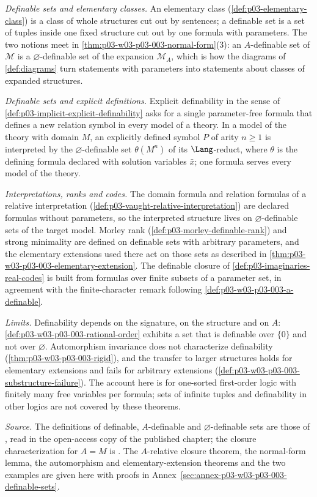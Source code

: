 \emph{Definable sets and elementary classes.}  An elementary class
(\cref{def:p03-elementary-class}) is a class of whole structures cut out by
sentences; a definable set is a set of tuples inside one fixed structure cut
out by one formula with parameters.  The two notions meet in
\cref{thm:p03-w03-p03-003-normal-form}(3): an \(A\)-definable set of
\(\mathcal M\) is a \(\varnothing\)-definable set of the expansion
\(\mathcal M_A\), which is how the diagrams of \cref{def:diagrams} turn
statements with parameters into statements about classes of expanded
structures.

\emph{Definable sets and explicit definitions.}  Explicit definability in
the sense of \cref{def:p03-implicit-explicit-definability} asks for a single
parameter-free formula that defines a new relation symbol in every model of
a theory.  In a model of the theory with domain \(M\), an explicitly
defined symbol \(P\) of arity \(n\geq1\) is
interpreted by the \(\varnothing\)-definable set \(\theta(M^n)\) of its
\(\Lang\)-reduct, where \(\theta\) is the defining formula declared with
solution variables \(\bar x\); one formula serves every model of the theory.

\emph{Interpretations, ranks and codes.}  The domain formula and relation
formulas of a relative interpretation
(\cref{def:p03-vaught-relative-interpretation}) are declared formulas
without parameters, so the interpreted structure lives on
\(\varnothing\)-definable sets of the target model.  Morley rank
(\cref{def:p03-morley-definable-rank}) and strong minimality are defined on
definable sets with arbitrary parameters, and the elementary extensions used
there act on those sets as described in
\cref{thm:p03-w03-p03-003-elementary-extension}.  The definable closure of
\cref{def:p03-imaginaries-real-codes} is built from formulas over finite
subsets of a parameter set, in agreement with the finite-character remark
following \cref{def:p03-w03-p03-003-a-definable}.

\emph{Limits.}  Definability depends on the signature, on the structure and
on \(A\): \cref{def:p03-w03-p03-003-rational-order} exhibits a set that is
definable over \(\{0\}\) and not over \(\varnothing\).  Automorphism
invariance does not characterize definability
(\cref{thm:p03-w03-p03-003-rigid}), and the transfer to larger structures
holds for elementary extensions and fails for arbitrary extensions
(\cref{def:p03-w03-p03-003-substructure-failure}).  The account here is for
one-sorted first-order logic with finitely many free variables per formula;
sets of infinite tuples and definability in other logics are not covered by
these theorems.

\emph{Source.}  The definitions of definable, \(A\)-definable and
\(\varnothing\)-definable sets are those of
\cite[p.~17]{Marker2000IntroductionModelTheory}, read in the open-access
copy of the published chapter; the closure characterization for \(A=M\) is
\cite[Proposition~1.3, p.~18]{Marker2000IntroductionModelTheory}.  The
\(A\)-relative closure theorem, the normal-form lemma, the automorphism and
elementary-extension theorems and the two examples are given here with
proofs in Annex~\ref{sec:annex-p03-w03-p03-003-definable-sets}.
